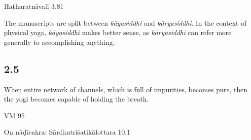 \begin{ekdosis}

\begin{testimonia}[hp02_004]
Haṭharatnāvalī 3.81

\begin{versinnote}
\end{versinnote}
\end{testimonia}

\begin{philcomm}[hp02_004]
The manuscripts are split between \emph{kāyasiddhi} and \emph{kāryasiddhi}. In the context of physical yoga, \emph{kāyasiddhi} makes better sense, as \emph{kāryasiddhi} can refer more generally to accomplishing anything. 
\end{philcomm}

\subsection*{2.5}
\begin{translation}[hp02_005]
When entire network of channels, which is full of impurities, becomes pure, then the yogi becomes capable of holding the breath.
\end{translation}

\begin{sources}[hp02_005]
VM 95

\begin{versinnote}
\end{versinnote}
On nāḍīcakra: Sārdhatriśatikālottara 10.1

\begin{versinnote}
\end{versinnote}
\end{sources}


\end{ekdosis}
